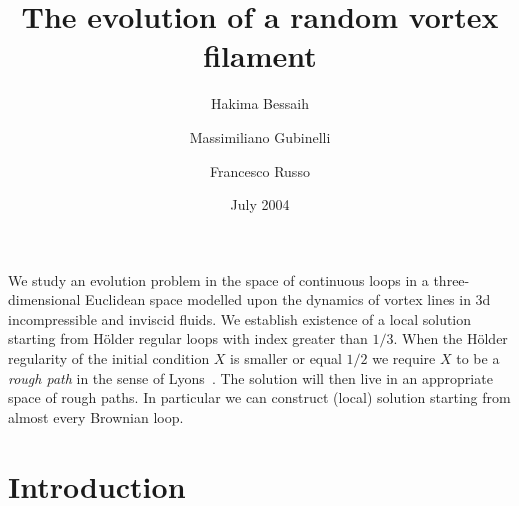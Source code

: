 \documentclass[a4paper,12pt,reqno]{amsart}
\begin{document}
\title[Evolution of a Random Vortex]{The evolution of a random  vortex filament}
\date{July 2004}
\author{Hakima Bessaih \and Massimiliano Gubinelli \and Francesco Russo}
\address{
Dept. of Mathematics\\
University of Wyoming\\
Ross Hall 210 --
Laramie WY 82071, USA}
\address{Institue Galil\'ee, Mathematiques\\
Universit\'e Paris 13\\
99, av. J.-B. Cl\'ement - F-93430 Villetaneuse, FRANCE 
}
\address{Institue Galil\'ee, Mathematiques\\
Universit\'e Paris 13\\
99, av. J.-B. Cl\'ement - F-93430 Villetaneuse, FRANCE }

\abstract
We study an evolution problem in the space of continuous loops in a
three-dimensional Euclidean space modelled upon the dynamics of vortex
lines in 3d incompressible and inviscid fluids. We establish existence
of a local solution starting from H\"older regular loops with index
greater than $1/3$.  When the H\"older regularity of the initial
condition $X$ is smaller or equal $1/2$ we require $X$ to be a
\emph{rough path} in the sense of Lyons~\cite{Lyons,LyonsBook}. The solution
will then live in an appropriate space of rough paths. In particular
we can construct (local) solution starting from almost every Brownian loop.
\endabstract
\maketitle

\section{Introduction}
\end{document}
